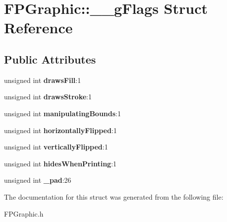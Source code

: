\hypertarget{struct_f_p_graphic_1_1____g_flags}{}\section{F\+P\+Graphic\+::\+\_\+\+\_\+g\+Flags Struct Reference}
\label{struct_f_p_graphic_1_1____g_flags}
\subsection*{Public Attributes}
\begin{DoxyCompactItemize}
\item 
\mbox{\label{struct_f_p_graphic_1_1____g_flags_aafa9adc052be1a9a4f6d2b96fb0bf9fb}} 
unsigned int {\bfseries draws\+Fill}\+:1
\item 
\mbox{\label{struct_f_p_graphic_1_1____g_flags_a6ff17edda743a9a7b796bd3f954abbc3}} 
unsigned int {\bfseries draws\+Stroke}\+:1
\item 
\mbox{\label{struct_f_p_graphic_1_1____g_flags_aa437a0d0fca29b42e28486852a480e2f}} 
unsigned int {\bfseries manipulating\+Bounds}\+:1
\item 
\mbox{\label{struct_f_p_graphic_1_1____g_flags_ab43eb5389d283deb31f37e75bd86c982}} 
unsigned int {\bfseries horizontally\+Flipped}\+:1
\item 
\mbox{\label{struct_f_p_graphic_1_1____g_flags_a709cb441097bb247e72cd5ac226f8fc4}} 
unsigned int {\bfseries vertically\+Flipped}\+:1
\item 
\mbox{\label{struct_f_p_graphic_1_1____g_flags_aa5bead8c26359c5c99d09b8a054973a8}} 
unsigned int {\bfseries hides\+When\+Printing}\+:1
\item 
\mbox{\label{struct_f_p_graphic_1_1____g_flags_ac474cccaba118b4a53edc215ff764aae}} 
unsigned int {\bfseries \+\_\+pad}\+:26
\end{DoxyCompactItemize}


The documentation for this struct was generated from the following file\+:\begin{DoxyCompactItemize}
\item 
F\+P\+Graphic.\+h\end{DoxyCompactItemize}
